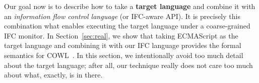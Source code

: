 


Our goal now is to describe how to take a \textbf{{\color{red} target
language}}
and combine it with an \textit{{\color{blue} information flow control language}}
(or IFC-aware API).  It is precisely this combination what enables executing the
target language under a coarse-grained IFC monitor. In Section~\ref{sec:real},
we show that taking ECMAScript as the target language and combining it with our
IFC language provides the formal semantics for COWL~\cite{swapi}.  In this
section, we intentionally avoid too much detail about the target language; after
all, our technique really does not care too much about what, exactly, is in
there.

